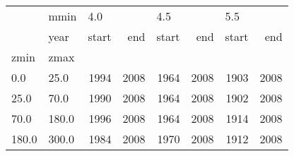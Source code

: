 \begin{tabular}{llrrrrrr}
\toprule
      & mmin & \multicolumn{2}{l}{4.0} & \multicolumn{2}{l}{4.5} & \multicolumn{2}{l}{5.5} \\
      & year & start &   end & start &   end & start &   end \\
zmin & zmax &       &       &       &       &       &       \\
\midrule
0.0   & 25.0  &  1994 &  2008 &  1964 &  2008 &  1903 &  2008 \\
25.0  & 70.0  &  1990 &  2008 &  1964 &  2008 &  1902 &  2008 \\
70.0  & 180.0 &  1996 &  2008 &  1964 &  2008 &  1914 &  2008 \\
180.0 & 300.0 &  1984 &  2008 &  1970 &  2008 &  1912 &  2008 \\
\bottomrule
\end{tabular}

